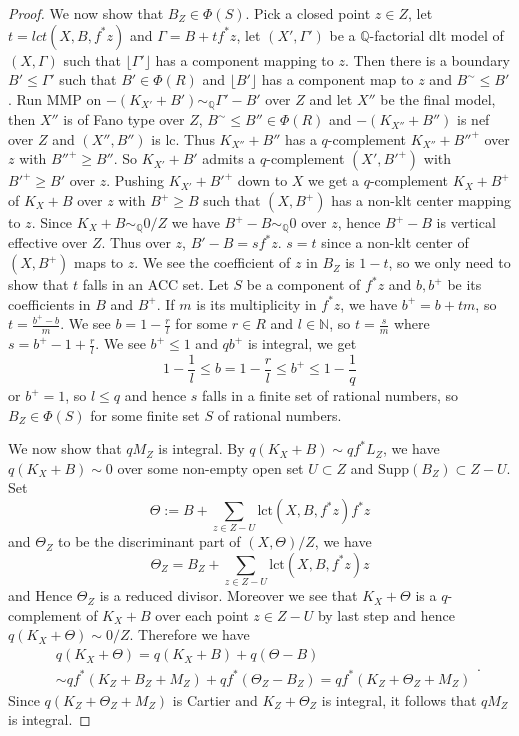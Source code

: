 \documentclass[letterpaper,reqno,12pt]{amsart}
\numberwithin{equation}{section}
\theoremstyle{plain}
\begin{document}
\begin{proof}
    We now show that $B_Z\in\Phi(S)$. Pick a closed point $z\in Z$, let $t=lct(X,B,f^*z)$ and $\Gamma=B+tf^*z$, let $(X',\Gamma')$ be a ${\mathbb Q}$-factorial dlt model of $(X,\Gamma)$ such that $\lfloor \Gamma'\rfloor$ has a component mapping to $z$. Then there is a boundary $B'\leq \Gamma'$ such that $B'\in\Phi( R)$ and $\lfloor B'\rfloor$ has a component map to $z$ and $B^\sim\leq B'$. Run MMP on $-(K_{X'}+B')\sim_{\mathbb Q} \Gamma'-B'$ over $Z$ and let $X''$ be the final model, then $X''$ is of Fano type over $Z$, $B^\sim\leq B''\in\Phi(R)$ and $-(K_{X''}+B'')$ is nef over $Z$ and $(X'',B'')$ is lc. Thus $K_{X''}+B''$ has a $q$-complement $K_{X''}+B''^+$ over $z$ with $B''^+\geq B''$. So $K_{X'}+B'$ admits a $q$-complement $(X',B'^+)$ with $B'^+\geq B'$ over $z$. Pushing $K_{X'}+B'^+$ down to $X$ we get a $q$-complement $K_X+B^+$ of $K_X+B$ over $z$ with $B^+\geq B$ such that $(X,B^+)$ has a non-klt center mapping to $z$. Since $K_X+B\sim_{\mathbb Q} 0/Z$ we have $B^+-B\sim_{\mathbb Q}0$ over $z$, hence $B^+-B$ is vertical effective over $Z$. Thus over $z$, $B'-B=sf^*z$. $s=t$ since a non-klt center of $(X,B^+)$ maps to $z$. We see the coefficient of $z$ in $B_Z$ is $1-t$, so we only need to show that $t$ falls in an ACC set. Let $S$ be a component of $f^*z$ and $b,b^+$ be its coefficients in $B$ and $B^+$. If $m$ is its multiplicity in $f^*z$, we have $b^+=b+tm$, so $t=\frac{b^+-b}{m}$. We see $b=1-\frac{r}{l}$ for some $r\in R$ and $l\in\mathbb N$, so $t=\frac{s}{m}$ where $s=b^+-1+\frac{r}{l}$. We see $b^+\leq 1$ and $qb^+$ is integral, we get \[1-\frac{1}{l}\leq b=1-\frac{r}{l}\leq b^+\leq 1-\frac{1}{q}\] or $b^+=1$, so $l\leq q$ and hence $s$ falls in a finite set of rational numbers, so $B_Z\in\Phi( S)$ for some finite set $ S$ of rational numbers.

    We now show that $qM_Z$ is integral. By $q(K_X+B)\sim qf^*L_Z$, we have $q(K_X+B)\sim 0$ over some non-empty open set $U\subset Z$ and $\text{Supp}(B_Z)\subset Z-U$. Set \[\Theta:=B+\sum\limits_{z\in Z-U}\text{lct}(X,B,f^*z)f^*z\] and $\Theta_Z$ to be the discriminant part of $(X,\Theta)/Z$, we have \[\Theta_Z=B_Z+\sum\limits_{z\in Z-U}\text{lct}(X,B,f^*z)z\] and Hence $\Theta_Z$ is a reduced divisor. Moreover we see that $K_X+\Theta$ is a $q$-complement of $K_X+B$ over each point $z\in Z-U$ by last step and hence $q(K_X+\Theta)\sim0/Z$. Therefore we have \[\begin{aligned}&q(K_X+\Theta)=q(K_X+B)+q(\Theta-B)\\&\sim qf^*(K_Z+B_Z+M_Z)+qf^*(\Theta_Z-B_Z)= qf^*(K_Z+\Theta_Z+M_Z)\end{aligned}.\] Since $q(K_{Z}+\Theta_{Z}+M_{Z})$ is Cartier and $K_{Z}+\Theta_{Z}$ is integral, it follows that $qM_{Z}$ is integral.


\end{proof}
\end{document}
